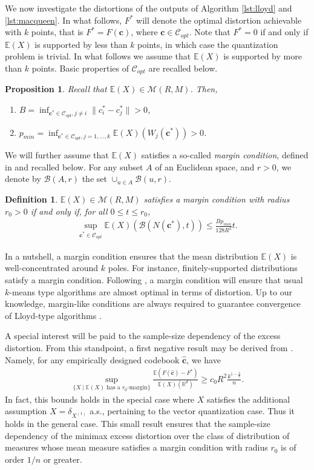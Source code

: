 \documentclass[noinfoline,preprint]{article}
\newtheorem{defi}[theorem]{Definition}
\newtheorem{prop}[theorem]{Proposition}
\newcommand{\cb}{\mathbf{c}}
\newcommand{\R}{\mathbb{R}}
\newcommand{\E}{\mathbb{E}}
\renewcommand{\1}{\mathds 1}
\newcommand{\B}{\mathcal{B}}
\begin{document}
We now investigate the distortions of the outputs of Algorithm \ref{lst:lloyd} and \ref{lst:macqueen}.  In what follows, $F^*$ will denote the optimal distortion achievable with $k$ points, that is $F^* = F(\cb)$, where $\cb \in \mathcal{C}_{opt}$. Note that $F^*=0$ if and only if $\E(X)$ is supported by less than $k$ points, in which case the quantization problem is trivial. In what follows we assume that $\E(X)$ is supported by more than $k$ points. Basic properties of $\mathcal{C}_{opt}$ are recalled below.
\begin{prop}{\cite[Proposition 1]{Levrard18}}\label{prop:B_p_min} Recall that $\mathbb{E}(X) \in \mathcal{M}(R,M)$. Then,
\begin{enumerate}
\item $ B = \inf_{\cb^* \in \mathcal{C}_{opt}, j \neq i}{\|c_i^* - c_j^*\|} >0$,
\item $p_{min} = \inf_{\cb^* \in \mathcal{C}_{opt}, j=1, \hdots, k}{\E(X) \left ( W_j(\cb^*) \right )} >0$.
\end{enumerate}
\end{prop}
We will further assume that $\E(X)$ satisfies a so-called \textit{margin condition}, defined in \cite[Definition 2.1]{Levrard15} and recalled below. For any subset $A$ of an Euclidean space, and $r>0$, we denote by $\B(A,r)$ the set $\cup_{u \in A} \B(u,r)$.
   \begin{defi}\label{def:margincondition}
         $\E(X) \in \mathcal{M}(R,M)$ satisfies a margin condition with radius $r_0 >0$ if and only if, for all $0 \leq t \leq r_0$,
					\begin{align*}
					 \sup_{\cb^* \in \mathcal{C}_{opt}} \E(X) \left ( \mathcal{B}(N(\cb^*),t) \right )  \leq \frac{B p_{min}}{128 R^2}t.
					\end{align*}
         \end{defi}
In a nutshell, a margin condition ensures that the mean distribution $\E(X)$ is well-concentrated around $k$ poles. For instance, finitely-supported distributions satisfy a margin condition. 
Following \cite{Levrard18}, a margin condition will ensure that usual $k$-means type  algorithms are almost optimal in terms of distortion. Up to our knowledge, margin-like conditions are always required to guarantee convergence of Lloyd-type algorithms \cite{Monteleoni16,Levrard18}. 

 A special interest will be paid to the sample-size dependency of the excess distortion. From this standpoint, a first negative result may be derived from \cite[Proposition 7]{Levrard18}.  Namely, for any empirically designed codebook $\hat{\cb}$, we have
\begin{align}\label{eq:borneinf}
\sup_{\{X \mid \E(X)\mbox{ has a $r_0$-margin}\}} \frac{\E( F(\hat{\cb}) - F^*)}{\E(X)(\R^d)} \geq c_0 R^2 \frac{k^{ 1 - \frac{2}{d}}}{n}. 
\end{align}
In fact, this bounds holds in the special case where $X$ satisfies the additional assumption $X=\delta_{X^{(1)}}$ a.s., pertaining to the vector quantization case. Thus it holds in the general case. This small result ensures that the sample-size dependency of the minimax excess distortion over the class of distribution of measures whose mean measure satisfies a margin condition with radius $r_0$ is of order $1/n$ or greater. 
\end{document}
